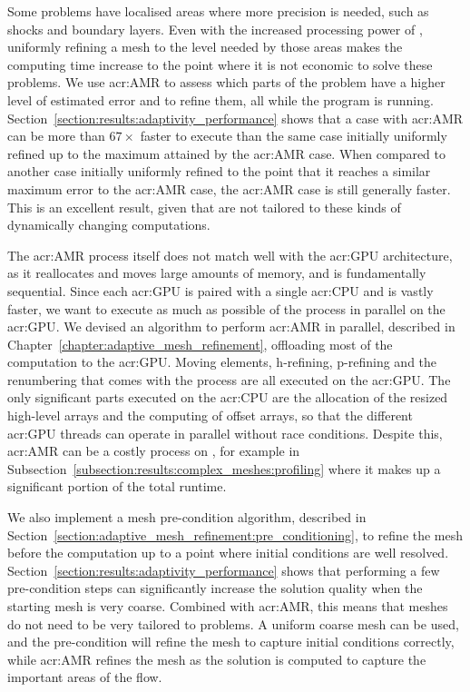 Some problems have localised areas where more precision is needed, such as shocks and boundary
layers. Even with the increased processing power of , uniformly refining a mesh
to the level needed by those areas makes the computing time increase to the point where it is not
economic to solve these problems. We use \acrlong{acr:AMR} to assess which parts of the problem have
a higher level of estimated error and to refine them, all while the program is running.
Section~\ref{section:results:adaptivity_performance} shows that a case with \acrshort{acr:AMR} can
be more than \(67 \times \) faster to execute than the same case initially uniformly refined up to
the maximum attained by the \acrshort{acr:AMR} case. When compared to another case initially
uniformly refined to the point that it reaches a similar maximum error to the \acrshort{acr:AMR}
case, the \acrshort{acr:AMR} case is still generally faster. This is an excellent result, given that
 are not tailored to these kinds of dynamically changing computations. 

The \acrshort{acr:AMR} process itself does not match well with the \acrshort{acr:GPU} architecture,
as it reallocates and moves large amounts of memory, and is fundamentally sequential. Since each
\acrshort{acr:GPU} is paired with a single \acrshort{acr:CPU} and is vastly faster, we want to
execute as much as possible of the process in parallel on the \acrshort{acr:GPU}. We devised an
algorithm to perform \acrshort{acr:AMR} in parallel, described in
Chapter~\ref{chapter:adaptive_mesh_refinement}, offloading most of the computation to the
\acrshort{acr:GPU}. Moving elements, h-refining, p-refining and the renumbering that comes with the
process are all executed on the \acrshort{acr:GPU}. The only significant parts executed on the
\acrshort{acr:CPU} are the allocation of the resized high-level arrays and the computing of offset
arrays, so that the different \acrshort{acr:GPU} threads can operate in parallel without race
conditions. Despite this, \acrshort{acr:AMR} can be a costly process on , for
example in Subsection~\ref{subsection:results:complex_meshes:profiling} where it makes up a
significant portion of the total runtime.

We also implement a mesh pre-condition algorithm, described in
Section~\ref{section:adaptive_mesh_refinement:pre_conditioning}, to refine the mesh before the
computation up to a point where initial conditions are well resolved.
Section~\ref{section:results:adaptivity_performance} shows that performing a few pre-condition steps
can significantly increase the solution quality when the starting mesh is very coarse. Combined with
\acrshort{acr:AMR}, this means that meshes do not need to be very tailored to problems. A uniform
coarse mesh can be used, and the pre-condition will refine the mesh to capture initial conditions
correctly, while \acrshort{acr:AMR} refines the mesh as the solution is computed to capture the
important areas of the flow.

